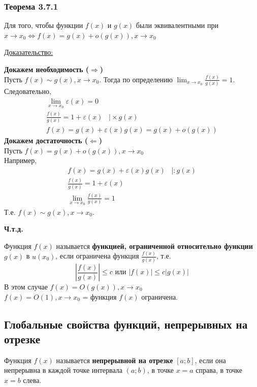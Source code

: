 \documentclass[12pt]{article}
\begin{document}
    \subsubsection*{Теорема 3.7.1}\label{th:3.7.1}
    Для того, чтобы функции $f(x)$ и $g(x)$ были эквивалентными при $x \to x_0 \Longleftrightarrow f(x) = g(x) + o(g(x)), x \to x_0$\par\noindent
    \underline{Доказательство:}
    \begin{adjustwidth}{1.5em}{1.5em}
        \textbf{Докажем необходимость ($\Rightarrow$)}\\
        Пусть $f(x) \sim g(x), x \to x_0$. Тогда по определению $\lim_{x \to x_0}\frac{f(x)}{g(x)} = 1$.\\
        Следовательно, \begin{gather*}
            \lim_{x\to x_0}\varepsilon(x) = 0\\
            \frac{f(x)}{g(x)} = 1 + \varepsilon(x)\,\,\,\,\, \Big| \times g(x)\\
            f(x) = g(x) + \varepsilon(x) g(x) = g(x) + o(g(x))
        \end{gather*}\noindent
        \textbf{Докажем достаточность ($\Leftarrow$)}\\
        Пусть $f(x) = g(x) + o(g(x)), x \to x_0$\\
        Например, 
        \begin{gather*}
            f(x) = g(x) + \varepsilon(x) g(x)\,\,\,\,\, \Big| : g(x)\\
            \frac{f(x)}{g(x)} = 1 + \varepsilon(x)\\
            \lim_{x \to x_0} \frac{f(x)}{g(x)} = 1
        \end{gather*}
        Т.е. $f(x) \sim g(x), x \to x_0$.
        \begin{center}
            \textbf{Ч.т.д.}
        \end{center}
    \end{adjustwidth}\noindent
    Функция $f(x)$ называется \textbf{функцией, ограниченной относительно функции} $g(x)$ в $u(x_0)$, если ограничена функция $\frac{f(x)}{g(x)}$, т.е.
    \[ \left|\frac{f(x)}{g(x)}\right| \le c \text{ или } \left|f(x)\right| \le c\left|g(x)\right| \]
    В этом случае $f(x) = O(g(x)), x \to x_0$\\
    $f(x) = O(1), x \to x_0$ = функция $f(x)$ ограничена.
    
    \subsection{Глобальные свойства функций, непрерывных на отрезке}
    \noindent Функция $f(x)$ называется \textbf{непрерывной на отрезке} $[a; b]$, если она непрерывна в каждой точке интервала $(a; b)$, в точке $x = a$ справа, в точке $x = b$ слева.
\end{document}
